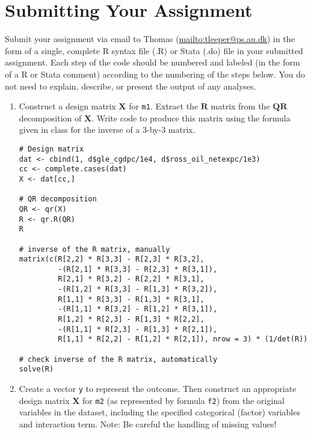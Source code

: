\documentclass[a4paper,12pt]{article}
\newcommand{\matr}[1]{\mathbf{#1}}
\begin{document}
\section*{Submitting Your Assignment}

\noindent Submit your assignment via email to Thomas (\url{mailto:tleeper@ps.au.dk}) in the form of a single, complete R syntax file (.R) or Stata (.do) file in your submitted assignment. Each step of the code should be numbered and labeled (in the form of a R or Stata comment) according to the numbering of the steps below. You do not need to explain, describe, or present the output of any analyses.


\clearpage

\doublespacing

\begin{enumerate}

\section*{Ordinary Least Squares Regression}

\item Construct a design matrix $\matr{X}$ for \texttt{m1}. Extract the $\matr{R}$ matrix from the $\matr{Q}\matr{R}$ decomposition of $\matr{X}$. Write code to produce this matrix using the formula given in class for the inverse of a 3-by-3 matrix.

\begin{solution}
\begin{lstlisting}
# Design matrix
dat <- cbind(1, d$gle_cgdpc/1e4, d$ross_oil_netexpc/1e3)
cc <- complete.cases(dat)
X <- dat[cc,]

# QR decomposition
QR <- qr(X)
R <- qr.R(QR)
R

# inverse of the R matrix, manually
matrix(c(R[2,2] * R[3,3] - R[2,3] * R[3,2],
         -(R[2,1] * R[3,3] - R[2,3] * R[3,1]),
         R[2,1] * R[3,2] - R[2,2] * R[3,1],
         -(R[1,2] * R[3,3] - R[1,3] * R[3,2]),
         R[1,1] * R[3,3] - R[1,3] * R[3,1],
         -(R[1,1] * R[3,2] - R[1,2] * R[3,1]),
         R[1,2] * R[2,3] - R[1,3] * R[2,2],
         -(R[1,1] * R[2,3] - R[1,3] * R[2,1]),
         R[1,1] * R[2,2] - R[1,2] * R[2,1]), nrow = 3) * (1/det(R))

# check inverse of the R matrix, automatically
solve(R)
\end{lstlisting}
\end{solution}

\item Create a vector \texttt{y} to represent the outcome. Then construct an appropriate design matrix $\matr{X}$ for \texttt{m2} (as represented by formula \texttt{f2}) from the original variables in the dataset, including the specified categorical (factor) variables and interaction term. Note: Be careful the handling of missing values!


\end{enumerate}
\end{document}
